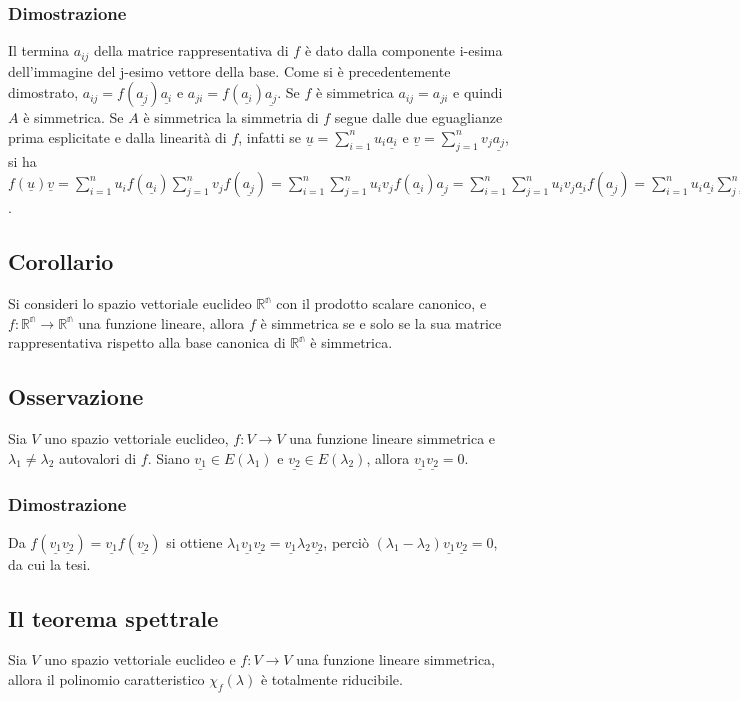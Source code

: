 \subsubsection{Dimostrazione}
Il termina $a_{ij}$ della matrice rappresentativa di $f$ \`e dato dalla componente i-esima dell'immagine del j-esimo vettore della base. Come si \`e precedentemente dimostrato, 
$a_{ij}=f(\underline{a_j})\underline{a_i}$ e $a_{ji}=f(\underline{a_i})\underline{a_j}$. Se $f$ \`e simmetrica $a_{ij}=a_{ji}$ e quindi $A$ \`e simmetrica. Se $A$ \`e simmetrica
la simmetria di $f$ segue dalle due eguaglianze prima esplicitate e dalla linearit\`a di $f$, infatti se $\underline{u}=\sum\limits_{i=1}^nu_i\underline{a_i}$ e $\underline{v}= 
\sum\limits_{j=1}^nv_j\underline{a_j}$, si ha $f(\underline{u})\underline{v}=\sum\limits_{i=1}^nu_if(\underline{a_i})\sum\limits_{j=1}^nv_jf(\underline{a_j})=
\sum\limits_{i=1}^n\sum\limits_{j=1}^nu_iv_jf(\underline{a_i})\underline{a_j}=\sum\limits_{i=1}^n\sum\limits_{j=1}^nu_iv_j\underline{a_i}f(\underline{a_j})=\sum\limits_{i=1}^nu_i
\underline{a_i}\sum\limits_{j=1}^nv_jf(\underline{a_j})=\underline{u}f(\underline{v})$.
\subsection{Corollario}
Si consideri lo spazio vettoriale euclideo $\mathbb{R^n}$ con il prodotto scalare canonico, e $f:\mathbb{R^n}\rightarrow\mathbb{R^n}$ una funzione lineare, allora $f$ \`e 
simmetrica se e solo se la sua matrice rappresentativa rispetto alla base canonica di $\mathbb{R^n}$ \`e simmetrica.
\subsection{Osservazione}
Sia $V$ uno spazio vettoriale euclideo, $f:V\rightarrow V$ una funzione lineare simmetrica e $\lambda_1\neq \lambda_2$ autovalori di $f$. Siano $\underline{v_1}\in E(\lambda_1)$ e $\underline{v_2}\in E(\lambda_2)$, allora $\underline{v_1}\underline{v_2}=0$.
\subsubsection{Dimostrazione}
Da $f(\underline{v_1}\underline{v_2})=\underline{v_1}f(\underline{v_2})$ si ottiene $\lambda_1\underline{v_1}\underline{v_2}=\underline{v_1}\lambda_2\underline{v_2}$, perci\`o 
$(\lambda_1-\lambda_2)\underline{v_1}\underline{v_2}=0$, da cui la tesi.
\subsection{Il teorema spettrale}
Sia $V$ uno spazio vettoriale euclideo e $f:V\rightarrow V$ una funzione lineare simmetrica, allora il polinomio caratteristico $\chi_f(\lambda)$ \`e totalmente riducibile.
